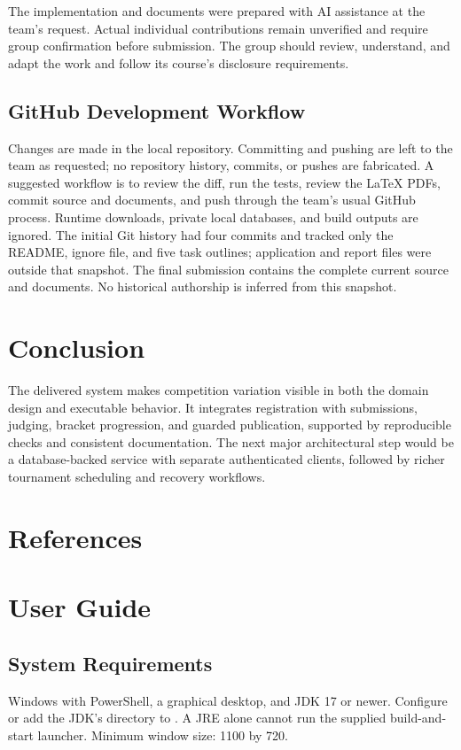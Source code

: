 \documentclass[12pt]{article}
\begin{document}
The implementation and documents were prepared with AI assistance at the team's request. Actual individual contributions remain unverified and require group confirmation before submission. The group should review, understand, and adapt the work and follow its course's disclosure requirements.
\subsection{GitHub Development Workflow}
Changes are made in the local repository. Committing and pushing are left to the team as requested; no repository history, commits, or pushes are fabricated. A suggested workflow is to review the diff, run the tests, review the LaTeX PDFs, commit source and documents, and push through the team's usual GitHub process. Runtime downloads, private local databases, and build outputs are ignored. The initial Git history had four commits and tracked only the README, ignore file, and five task outlines; application and report files were outside that snapshot. The final submission contains the complete current source and documents. No historical authorship is inferred from this snapshot.

\section{Conclusion}
The delivered system makes competition variation visible in both the domain design and executable behavior. It integrates registration with submissions, judging, bracket progression, and guarded publication, supported by reproducible checks and consistent documentation. The next major architectural step would be a database-backed service with separate authenticated clients, followed by richer tournament scheduling and recovery workflows.
\clearpage\section{References}


\clearpage\appendix
\section{User Guide}
\subsection{System Requirements}
Windows with PowerShell, a graphical desktop, and JDK 17 or newer. Configure  or add the JDK's  directory to . A JRE alone cannot run the supplied build-and-start launcher. Minimum window size: 1100 by 720.
\end{document}
